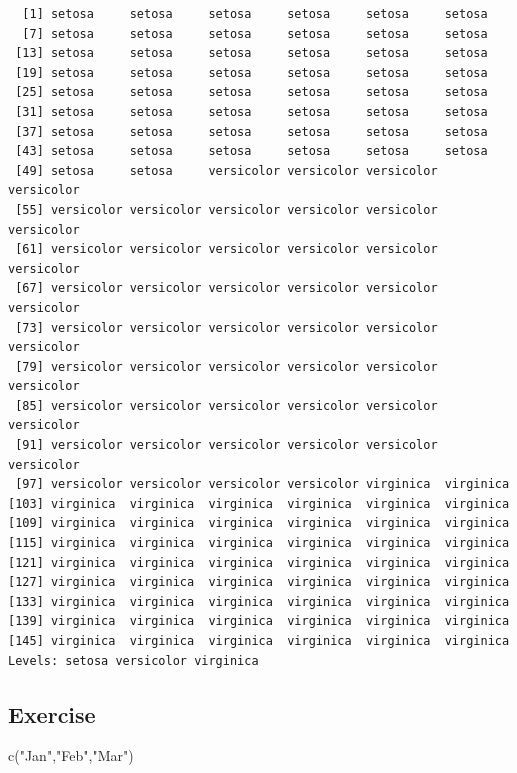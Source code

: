 \documentclass[
  letterpaper,
  DIV=11,
  numbers=noendperiod]{scrreprt}
\newenvironment{Shaded}{\begin{snugshade}}{\end{snugshade}}
\newcommand{\FunctionTok}[1]{\textcolor[rgb]{0.28,0.35,0.67}{#1}}
\newcommand{\NormalTok}[1]{\textcolor[rgb]{0.00,0.23,0.31}{#1}}
\newcommand{\StringTok}[1]{\textcolor[rgb]{0.13,0.47,0.30}{#1}}
\begin{document}
\begin{verbatim}
  [1] setosa     setosa     setosa     setosa     setosa     setosa    
  [7] setosa     setosa     setosa     setosa     setosa     setosa    
 [13] setosa     setosa     setosa     setosa     setosa     setosa    
 [19] setosa     setosa     setosa     setosa     setosa     setosa    
 [25] setosa     setosa     setosa     setosa     setosa     setosa    
 [31] setosa     setosa     setosa     setosa     setosa     setosa    
 [37] setosa     setosa     setosa     setosa     setosa     setosa    
 [43] setosa     setosa     setosa     setosa     setosa     setosa    
 [49] setosa     setosa     versicolor versicolor versicolor versicolor
 [55] versicolor versicolor versicolor versicolor versicolor versicolor
 [61] versicolor versicolor versicolor versicolor versicolor versicolor
 [67] versicolor versicolor versicolor versicolor versicolor versicolor
 [73] versicolor versicolor versicolor versicolor versicolor versicolor
 [79] versicolor versicolor versicolor versicolor versicolor versicolor
 [85] versicolor versicolor versicolor versicolor versicolor versicolor
 [91] versicolor versicolor versicolor versicolor versicolor versicolor
 [97] versicolor versicolor versicolor versicolor virginica  virginica 
[103] virginica  virginica  virginica  virginica  virginica  virginica 
[109] virginica  virginica  virginica  virginica  virginica  virginica 
[115] virginica  virginica  virginica  virginica  virginica  virginica 
[121] virginica  virginica  virginica  virginica  virginica  virginica 
[127] virginica  virginica  virginica  virginica  virginica  virginica 
[133] virginica  virginica  virginica  virginica  virginica  virginica 
[139] virginica  virginica  virginica  virginica  virginica  virginica 
[145] virginica  virginica  virginica  virginica  virginica  virginica 
Levels: setosa versicolor virginica
\end{verbatim}

\subsection{Exercise}\label{exercise-7}

\begin{Shaded}
\begin{Highlighting}[]
\FunctionTok{c}\NormalTok{(}\StringTok{"Jan"}\NormalTok{,}\StringTok{"Feb"}\NormalTok{,}\StringTok{"Mar"}\NormalTok{)}
\end{Highlighting}
\end{Shaded}
\end{document}
